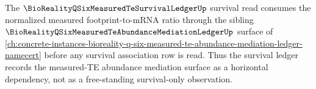 The $\BioRealityQSixMeasuredTeSurvivalLedgerUp$ survival read consumes the normalized measured footprint-to-mRNA ratio through the sibling $\BioRealityQSixMeasuredTeAbundanceMediationLedgerUp$ surface of \autoref{ch:concrete-instances-bioreality-q-six-measured-te-abundance-mediation-ledger-namecert} before any survival association row is read. Thus the survival ledger records the measured-TE abundance mediation surface as a horizontal dependency, not as a free-standing survival-only observation.

